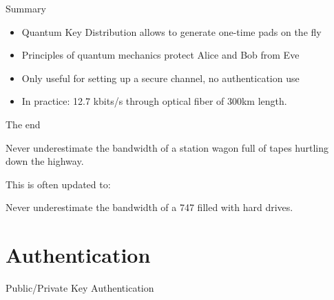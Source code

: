 \documentclass{beamer}
\begin{document}
	\begin{frame}{Summary} %
		\begin{itemize}
			\item Quantum Key Distribution allows to generate one-time pads on the fly
			\item Principles of quantum mechanics protect Alice and Bob from Eve
			\item Only useful for setting up a secure channel, no authentication use
			\item In practice: 12.7 kbits/s through optical fiber of 300km length.
		\end{itemize}
	\end{frame}

	\begin{frame}{The end}
		\begin{shadequote}{}
			Never underestimate the bandwidth of a station wagon full of tapes hurtling down the highway.
		\end{shadequote}

		\vspace{1em}
		This is often updated to:
		\vspace{0.5em}


		\begin{shadequote}{}
			Never underestimate the bandwidth of a 747 filled with hard drives.
		\end{shadequote}
	\end{frame}


	\section{Authentication}

	\begin{frame}{Public/Private Key Authentication} %

	\end{frame}


	\begin{frame}[plain]\end{frame}
\end{document}
